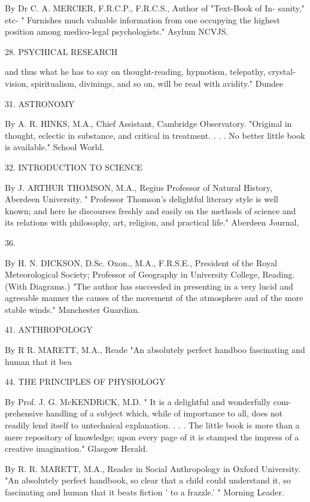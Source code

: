 \documentclass[12pt,leqno]{book}[2005/09/16]
\begin{document}
By Dr C. A. MERCIER, F.R.C.P., F.R.C.S., Author of "Text-Book of In-
sanity," etc- " Furnishes much valuable information from one occupying the
highest position among medico-legal psychologists." Asylum NCVJS.

28. PSYCHICAL RESEARCH



and thus what he has to say on thought-reading, hypnotism, telepathy, crystal-
vision, spiritualism, divinings, and so on, will be read with avidity." Dundee




31. ASTRONOMY

By A. R. HINKS, M.A., Chief Assistant, Cambridge Observatory. "Original
in thought, eclectic in substance, and critical in treatment. . . . No better
little book is available." School World.

32. INTRODUCTION TO SCIENCE

By J. ARTHUR THOMSON, M.A., Regius Professor of Natural History, Aberdeen
University. " Professor Thomson's delightful literary style is well known; and
here he discourses freshly and easily on the methods of science and its relations
with philosophy, art, religion, and practical life." Aberdeen Journal,

36.



By H. N. DICKSON, D.Sc. Oxon., M.A., F.R.S.E., President of the Royal
Meteorological Society; Professor of Geography in University College, Reading.
(With Diagrams.) "The author has succeeded in presenting in a very lucid
and agreeable manner the causes of the movement of the atmosphere and of
the more stable winds." Manchester Guardian.

41. ANTHROPOLOGY

By R R. MARETT, M.A., Reade
"An absolutely perfect handboo
fascinating and human that it bea

44. THE PRINCIPLES OF PHYSIOLOGY

By Prof. J. G. McKENDRiCK, M.D. " It is a delightful and wonderfully com-
prehensive handling of a subject which, while of importance to all, does not
readily lend itself to untechnical explanation. . . . The little book is more than
a mere repository of knowledge; upon every page of it is stamped the impress
of a creative imagination." Glasgow Herald.



By R. R. MARETT, M.A., Reader in Social Anthropology in Oxford University.
"An absolutely perfect handbook, so clear that a child could understand it, so
fascinating and human that it beats fiction ' to a frazzle.' " Morning Leader.
\end{document}
